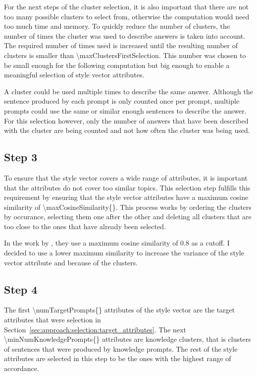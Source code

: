 For the next steps of the cluster selection, it is also important that there are not too many possible clusters to select from, otherwise the computation would need too much time and memory. To quickly reduce the number of clusters, the number of times the cluster was used to describe answers is taken into account. The required number of times used is increased until the resulting number of clusters is smaller than \num{\maxClustersFirstSelection}. This number was chosen to be small enough for the following computation but big enough to enable a meaningful selection of style vector attributes.

A cluster could be used multiple times to describe the same answer. Although the sentence produced by each prompt is only counted once per prompt, multiple prompts could use the same or similar enough sentences to describe the answer. For this selection however, only the number of answers that have been described with the cluster are being counted and not how often the cluster was being used.

\subsection{Step 3}
To ensure that the style vector covers a wide range of attributes, it is important that the attributes do not cover too similar topics. This selection step fulfills this requirement by ensuring that the style vector attributes have a maximum cosine similarity of \num{\maxCosineSimilarity{}}. This process works by ordering the clusters by occurance, selecting them one after the other and deleting all clusters that are too close to the ones that have already been selected.

In the work by \citeauthor{patelLearningInterpretableStyle2023}, they use a maximum cosine similarity of \num{0.8} as a cutoff. I decided to use a lower maximum similarity to increase the variance of the style vector attribute and because of the clusters. %

\subsection{Step 4}
The first \num{\numTargetPrompts{}} attributes of the style vector are the target attributes that were selection in Section~\ref{sec:approach:selection:target_attributes}. The next \num{\minNumKnowledgePrompts{}} attributes are knowledge clusters, that is clusters of sentences that were produced by knowledge prompts. The rest of the style attributes are selected in this step to be the ones with the highest range of accordance. %

